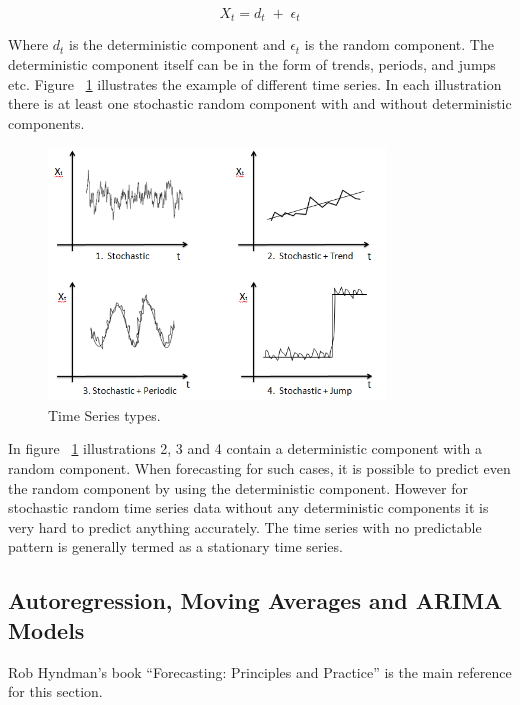 \begin{equation}
X_{t}= d_{t}\;+\;\epsilon_{t} 
\end{equation}  

Where \(d_{t}\) is the deterministic component and \(\epsilon_{t}\) is the random component. The deterministic component itself can be in the form of trends, periods, and jumps etc. Figure ~\ref{fig:time_series} illustrates the example of different time series. In each illustration there is at least one stochastic random component with and without deterministic components. 
\begin{figure}[ht]
  \begin{center}
    \includegraphics[width=0.8\textwidth]{images/time_series.png}
    \caption{ Time Series types\cite{mujumdarstochastic}.}
    \label{fig:time_series}
  \end{center}
\end{figure}  

In figure ~\ref{fig:time_series} illustrations 2, 3 and 4 contain a deterministic component with a random component. When forecasting for such cases, it is possible to predict even the random component by using the deterministic component. However for stochastic random time series data without any deterministic components it is very hard to predict anything accurately. The time series with no predictable pattern is generally termed as a stationary time series. 
 
\subsection{Autoregression, Moving Averages and ARIMA Models} \label{ARIMA}    
 Rob Hyndman's book ``Forecasting: Principles and Practice''\cite{hyndman2014forecasting} is the main reference for this section. 
